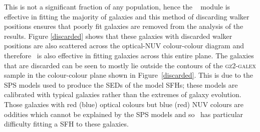 This is not a significant fraction of any population, hence the \starpy~ module is effective in fitting the majority of galaxies and this method of discarding walker positions ensures that poorly fit galaxies are removed from the analysis of the results. Figure \ref{discarded} shows that these galaxies with discarded walker positions are also scattered across the optical-NUV colour-colour diagram and therefore \starpy ~is also effective in fitting galaxies across this entire plane. The galaxies that are discarded can be seen to mostly lie outside the contours of the \textsc{gz2-galex} sample in the colour-colour plane shown in Figure~\ref{discarded}. This is due to the SPS models used to produce the SEDs of the model SFHs; these models are calibrated with typical galaxies rather than the extremes of galaxy evolution. Those galaxies with red (blue) optical colours but blue (red) NUV colours are oddities which cannot be explained by the SPS models and so \starpy~has particular difficulty fitting a SFH to these galaxies.

\begin{table}
\end{table}

